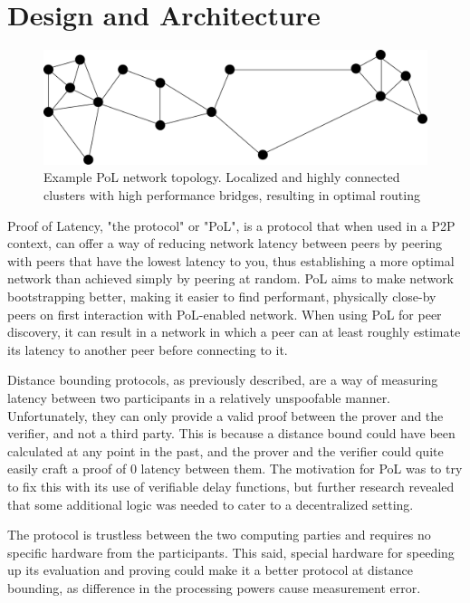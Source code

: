 \chapter{Design and Architecture}
\label{Proof of Latency}
\begin{figure}
	\includegraphics[width=\textwidth]{pictures/pol_topology.pdf}
	\caption{Example PoL network topology. Localized and highly connected clusters with high performance bridges, resulting in optimal routing}
	\label{PoL Example Topology}
\end{figure}
Proof of Latency, "the protocol" or "PoL", is a protocol that when used in a P2P context, can offer a way of reducing network latency between peers by peering with peers that have the lowest latency to you, thus establishing a more optimal network than achieved simply by peering at random. PoL aims to make network bootstrapping better, making it easier to find performant, physically close-by peers on first interaction with PoL-enabled network. When using PoL for peer discovery, it can result in a network in which a peer can at least roughly estimate its latency to another peer before connecting to it.

Distance bounding protocols, as previously described, are a way of measuring latency between two participants in a relatively unspoofable manner. Unfortunately, they can only provide a valid proof between the prover and the verifier, and not a third party. This is because a distance bound could have been calculated at any point in the past, and the prover and the verifier could quite easily craft a proof of 0 latency between them. The motivation for PoL was to try to fix this with its use of verifiable delay functions, but further research revealed that some additional logic was needed to cater to a decentralized setting.

The protocol is trustless between the two computing parties and requires no specific hardware from the participants. This said, special hardware for speeding up its evaluation and proving could make it a better protocol at distance bounding, as difference in the processing powers cause measurement error.

